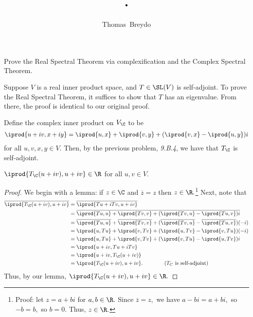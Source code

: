 \documentclass{amsart}
\title{\pagenum.\probnum}
\author{Thomas\ Breydo}
\begin{document}
\maketitle

\begin{problem*}
Prove the Real Spectral Theorem via complexification and the
Complex Spectral Theorem.
\end{problem*}

\vspace{0.5in}

Suppose $V$ is a real inner product space, and $T\in\SL(V)$
is self-adjoint. To prove the Real Spectral Theorem,
it suffices to show that $T$ has an eigenvalue. From there,
the proof is identical to our original proof.

Define the
complex inner product on $V_\C$ to be
\begin{align*}
    \iprod{u+iv,x+iy} = \iprod{u,x}+\iprod{v,y}+
    (\iprod{v,x}-\iprod{u,y})i
\end{align*}
for all $u,v,x,y\in V.$ Then, by the previous problem, \textit{9.B.4},
we have that $T_\C$ is self-adjoint.

\begin{claim*}
$\iprod{T_\C(u+iv),u+iv}\in\R$ for all $u,v\in V.$
\end{claim*}
\begin{proof}
We begin with a lemma: if $z\in\C$ and $\overline z=z$ then $z\in\R.$\footnote{
Proof: let $z=a+bi$ for $a,b\in\R.$ Since $\overline z=z,$
we have $a-bi=a+bi,$ so $-b=b,$ so $b=0.$ Thus, $z\in\R.$}
Next, note that
\begin{align*}
    \overline{\iprod{T_\C(u+iv),u+iv}}
    &= \overline{\iprod{Tu+iTv,u+iv}} \\
    &= \overline{\iprod{Tu,u}+\iprod{Tv,v}+(\iprod{Tv,u}-\iprod{Tu,v})i} \\
    &= \overline{\iprod{Tu,u}}+
    \overline{\iprod{Tv,v}}
    +(\overline{\iprod{Tv,u}}-\overline{\iprod{Tu,v}})
    (-i) \\
    &= \iprod{u,Tu}+\iprod{v,Tv}+(\iprod{u,Tv}-\iprod{v,Tu})(-i) \\
    &= \iprod{u,Tu}+\iprod{v,Tv}+(\iprod{v,Tu}-\iprod{u,Tv})i \\
    &= \iprod{u+iv,Tu+iTv} \\
    &= \iprod{u+iv,T_\C(u+iv)} \\
    &= \iprod{T_\C(u+iv), u+iv}.\qquad\qquad(T_C\text{ is self-adjoint})
\end{align*}
Thus, by our lemma, $\iprod{T_\C(u+iv),u+iv}\in\R.$
\end{proof}
\end{document}
